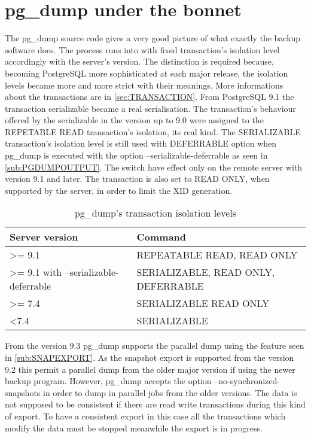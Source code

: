 \section{pg\_dump under the bonnet}
\label{sec:PGDUMPINT}
The pg\_dump source code gives a very good picture of what exactly the backup 
software does. The process runs into with fixed transaction's isolation level accordingly with the 
server's version. 
The distinction is required because, becoming PostgreSQL more sophisticated at each major release, 
the isolation levels became more and more strict with their meanings.\newline
More informations about the transactions are in \ref{sec:TRANSACTION}.\newline
From PostgreSQL 9.1 the transaction serializable became a real serialisation. The 
transaction's behaviour offered by the serializable in the version up to 9.0 were assigned to the 
REPETABLE READ transaction's isolation, its real kind. The SERIALIZABLE transaction's isolation 
level is still used with DEFERRABLE option when pg\_dump is executed with 
the option --serializable-deferrable as seen in \ref{sub:PGDUMPOUTPUT}. The switch have effect only 
on the remote server with version 9.1 and later. The transaction is also set to READ ONLY, when 
supported by the server, in order to limit the XID generation. \newline

\begin{table}[H]
  \begin{tabular}{ll}
    Server version & Command    \\ 
    \hline
    \textgreater=  9.1 &  REPEATABLE READ, READ ONLY        \\
    \textgreater= 9.1 with --serializable-deferrable  &  SERIALIZABLE, READ ONLY, DEFERRABLE  \\
    \textgreater= 7.4 &  SERIALIZABLE READ ONLY   \\
    \textless 7.4 &  SERIALIZABLE \\
  \end{tabular}
  \caption{\label{tab:TRNPGDUMP}pg\_dump's transaction isolation levels }
\end{table}

From the version 9.3 pg\_dump supports the parallel dump using the feature seen in  
\ref{sub:SNAPEXPORT}. As the snapshot export is supported from the version 9.2 this permit a 
parallel dump from the older major version if using the newer backup program. However, 
pg\_dump accepts the option --no-synchronized-snapshots in order to dump in parallel jobs 
from the older versions. The data is not supposed to be consistent if there are  read write 
transactions during this kind of export. To have a consistent export in this case all the 
transactions which modify the data must be stopped meanwhile the export is in progress.\newline 

